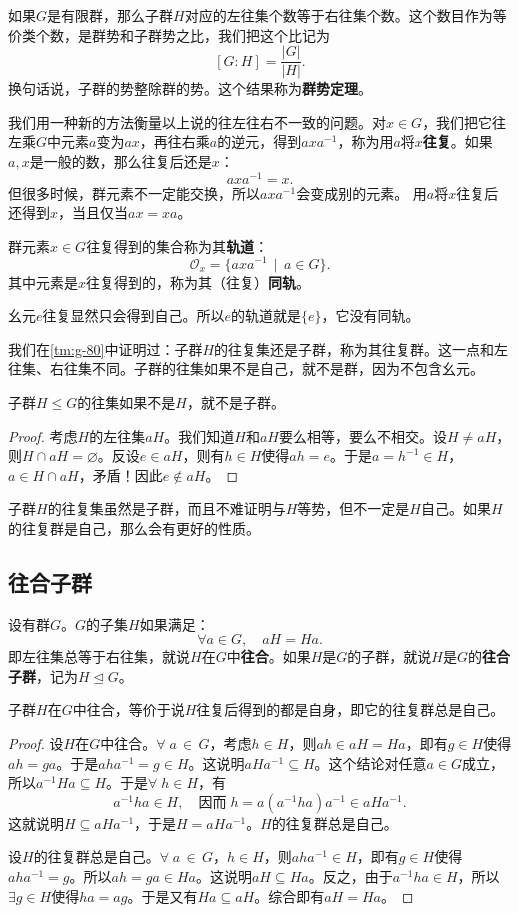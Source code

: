 \documentclass[12pt,UTF8,fontset=none]{ctexbook}
\begin{document}
如果$G$是有限群，那么子群$H$对应的左往集个数等于右往集个数。这个数目作为等价类个数，是群势和子群势之比，我们把这个比记为
$$ [G:H] = \frac{|G|}{|H|}. $$
换句话说，子群的势整除群的势。这个结果称为\textbf{群势定理}。

我们用一种新的方法衡量以上说的往左往右不一致的问题。对$x\in G$，我们把它往左乘$G$中元素$a$变为$ax$，再往右乘$a$的逆元，得到$axa^{-1}$，称为用$a$将$x$\textbf{往复}。如果$a,x$是一般的数，那么往复后还是$x$：
$$ axa^{-1} = x.$$
但很多时候，群元素不一定能交换，所以$axa^{-1}$会变成别的元素。
用$a$将$x$往复后还得到$x$，当且仅当$ax = xa$。

群元素$x\in G$往复得到的集合称为其\textbf{轨道}：
$$ \mathcal{O}_x = \{ axa^{-1} \, \mid \, a\in G \}. $$
其中元素是$x$往复得到的，称为其（往复）\textbf{同轨}。

幺元$e$往复显然只会得到自己。所以$e$的轨道就是$\{e\}$，它没有同轨。

我们在\ref{tm:g-80}中证明过：子群$H$的往复集还是子群，称为其往复群。这一点和左往集、右往集不同。子群的往集如果不是自己，就不是群，因为不包含幺元。
\begin{pp}
    子群$H\leq G$的往集如果不是$H$，就不是子群。
\end{pp}
\begin{proof}
    考虑$H$的左往集$aH$。我们知道$H$和$aH$要么相等，要么不相交。设$H\neq aH$，则$H\cap aH = \varnothing$。反设$e\in aH$，则有$h\in H$使得$ah = e$。于是$a = h^{-1}\in H$，$a\in H\cap aH$，矛盾！因此$e\notin aH$。
\end{proof}

子群$H$的往复集虽然是子群，而且不难证明与$H$等势，但不一定是$H$自己。如果$H$的往复群是自己，那么会有更好的性质。

\subsection{往合子群}
设有群$G$。$G$的子集$H$如果满足：
$$ \forall a\in G, \quad aH = Ha.$$
即左往集总等于右往集，就说$H$在$G$中\textbf{往合}。如果$H$是$G$的子群，就说$H$是$G$的\textbf{往合子群}，记为$H \trianglelefteq G$。

\begin{tm}\label{tm:g-120}
    子群$H$在$G$中往合，等价于说$H$往复后得到的都是自身，即它的往复群总是自己。
\end{tm}
\begin{proof}
    设$H$在$G$中往合。$\forall \; a\,\in\,G$，考虑$h\in H$，则$ah\in aH = Ha$，即有$g\in H$使得$ah = ga$。于是$aha^{-1} = g\in H$。这说明$aHa^{-1}\subseteq H$。这个结论对任意$a\in G$成立，所以$a^{-1}Ha \subseteq H$。于是$\forall \;h\in H$，有
    $$ a^{-1}ha\in H,\quad \mbox{因而}\; h = a(a^{-1}ha)a^{-1} \in aHa^{-1}. $$
    这就说明$H\subseteq aHa^{-1}$，于是$H = aHa^{-1}$。$H$的往复群总是自己。

    设$H$的往复群总是自己。$\forall \; a\,\in\,G$，$h\in H$，则$aha^{-1}\in H$，即有$g\in H$使得$aha^{-1} = g$。所以$ah = ga \in Ha$。这说明$aH \subseteq Ha$。反之，由于$a^{-1}ha\in H$，所以$\exists g\in H$使得$ha = ag$。于是又有$Ha\subseteq aH$。综合即有$aH = Ha$。

\end{proof}
\end{document}
